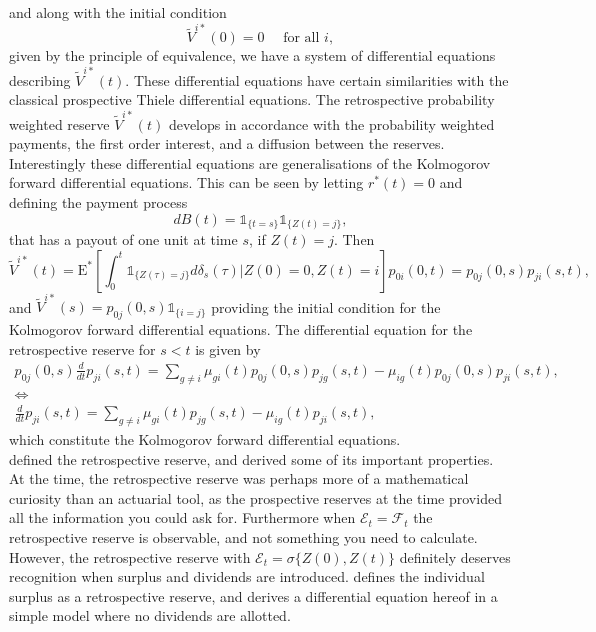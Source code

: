 \documentclass[12pt]{article}
\newcommand{\E}{\text{E}}
\newcommand{\indic}[1]{\mathds{1}_{ \{ #1 \} }}
\theoremstyle{my_thm}
\begin{document}
and along with the initial condition
$$
\tilde{V}^{i*}(0)=0 \quad \text{ for all } i,
$$
given by the principle of equivalence, we have a system of differential equations describing $\tilde{V}^{i*}(t)$. These differential equations have certain similarities with the classical prospective Thiele differential equations. The retrospective probability weighted reserve $\tilde{V}^{i*}(t)$ develops in accordance with the probability weighted payments, the first order interest, and a diffusion between the reserves. Interestingly these differential equations are generalisations of the Kolmogorov forward differential equations. This can be seen by letting $r^*(t)=0$ and defining the payment process
$$
dB(t)=\indic{t=s}\indic{Z(t)=j},
$$
that has a payout of one unit at time $s$, if $Z(t)=j$. Then 
$$
\tilde{V}^{i*}(t)=\E^* \left[ \int_0^t  \indic{Z(\tau)=j} d\delta_{s}(\tau) |Z(0)=0, Z(t)=i \right] p_{0i}(0,t) = p_{0j}(0,s)p_{ji}(s,t),
$$
and $\tilde{V}^{i*}(s)=p_{0j}(0,s)\indic{i=j}$ providing the initial condition for the Kolmogorov forward differential equations. The differential equation for the retrospective reserve for $s<t$ is given by 
\begin{gather*}
p_{0j}(0,s)\frac{d}{dt}p_{ji}(s,t)= \sum_{g\neq i} \mu_{gi}(t)p_{0j}(0,s)p_{jg}(s,t)- \mu_{ig}(t)p_{0j}(0,s)p_{ji}(s,t),
\\
\Leftrightarrow
\\
\frac{d}{dt}p_{ji}(s,t)= \sum_{g\neq i} \mu_{gi}(t)p_{jg}(s,t)- \mu_{ig}(t)p_{ji}(s,t),
\end{gather*}
which constitute the Kolmogorov forward differential equations. 
\\[12pt]
\citet{Norberg} defined the retrospective reserve, and derived some of its important properties. At the time, the retrospective reserve was perhaps more of a mathematical curiosity than an actuarial tool, as the prospective reserves at the time provided all the information you could ask for. Furthermore when $\mathcal{E}_t=\mathcal{F}_t$ the retrospective reserve is observable, and not something you need to calculate. However, the retrospective reserve with $\mathcal{E}_t=\sigma \{Z(0),Z(t)\}$ definitely deserves recognition when surplus and dividends are introduced. \citet{NorbergB} defines the individual surplus as a retrospective reserve, and derives a differential equation hereof in a simple model where no dividends are allotted.
\end{document}
